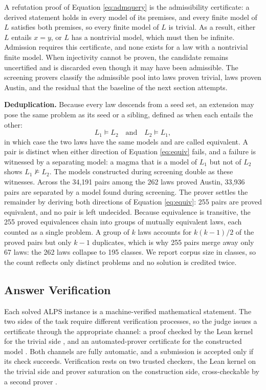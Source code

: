 \documentclass[letterpaper]{article} %
\begin{document}
A refutation proof of Equation \eqref{eq:admquery} is the admissibility certificate: a derived statement holds in every model of its premises, and every finite model of $L$ satisfies both premises, so every finite model of $L$ is trivial. As a result, either $L$ entails $x = y$, or $L$ has a nontrivial model, which must then be infinite. Admission requires this certificate, and none exists for a law with a nontrivial finite model. When injectivity cannot be proven, the candidate remains uncertified and is discarded even though it may have been admissible. The screening provers classify the admissible pool into laws proven trivial, laws proven Austin, and the residual that the baseline of the next section attempts.


\textbf{Deduplication.} Because every law descends from a seed set, an extension may pose the same problem as its seed or a sibling, defined as when each entails the other:
\begin{equation}\label{eq:equiv}
L_1 \models L_2
\quad\text{and}\quad
L_2 \models L_1,
\end{equation}
in which case the two laws have the same models and are called equivalent. A pair is distinct when either direction of Equation \eqref{eq:equiv} fails, and a failure is witnessed by a separating model: a magma that is a model of $L_1$ but not of $L_2$ shows $L_1 \not\models L_2$. The models constructed during screening double as these witnesses. Across the 34,191 pairs among the 262 laws proved Austin, 33,936 pairs are separated by a model found during screening. The prover settles the remainder by deriving both directions of Equation \eqref{eq:equiv}: 255 pairs are proved equivalent, and no pair is left undecided. Because equivalence is transitive, the 255 proved equivalences chain into groups of mutually equivalent laws, each counted as a single problem. A group of $k$ laws accounts for $k(k-1)/2$ of the proved pairs but only $k-1$ duplicates, which is why 255 pairs merge away only 67 laws: the 262 laws collapse to 195 classes. We report corpus size in classes, so the count reflects only distinct problems and no solution is credited twice.





\subsection{Answer Verification}
Each solved ALPS instance is a machine-verified mathematical statement. The two sides of the task require different verification processes, so the judge issues a certificate through the appropriate channel: a proof checked by the Lean kernel for the trivial side \citep{moura2021lean}, and an automated-prover certificate for the constructed model \citep{kovacs2013first}. Both channels are fully automatic, and a submission is accepted only if its check succeeds. Verification rests on two trusted checkers, the Lean kernel on the trivial side and prover saturation on the construction side, cross-checkable by a second prover \citep{smallbone2021twee}.
\end{document}
